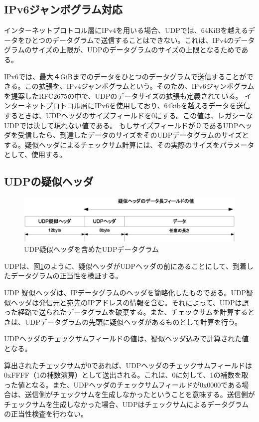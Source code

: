 \subsection{IPv6ジャンボグラム対応}
インターネットプロトコル層にIPv4を用いる場合、UDPでは、64KiBを越えるデータをひとつのデータグラムで送信することはできない。これは、IPv4のデータグラムのサイズの上限が、UDPのデータグラムのサイズの上限となるためである。

IPv6では、最大４GiBまでのデータをひとつのデータグラムで送信することができる。この拡張を、IPv4ジャンボグラムという。そのため、IPv6ジャンボグラムを提案したRFC2675の中で、UDPのデータサイズの拡張も定義されている。
インターネットプロトコル層にIPv6を使用しており、64kibを越えるデータを送信するときは、UDPヘッダのサイズフィールドを0にする。この値は、レガシーなUDPでは決して現れない値である。
もしサイズフィールドが０であるUDPヘッダを受信したら、到達したデータのサイズをそのUDPデータグラムのサイズとする。疑似ヘッダによるチェックサム計算には、その実際のサイズをパラメータとして、使用する。




\subsection{UDPの疑似ヘッダ}

\begin{figure}[htbp]
	\includegraphics[width=12cm,clip]{draw/udppseudoheader.eps}
	\caption{UDP疑似ヘッダを含めたUDPデータグラム}
	\label{fig:udppseudoheader}
\end{figure}


UDPは、図\ref{fig:udppseudoheader}のように、疑似ヘッダがUDPヘッダの前にあることにして、到着したデータグラムの正当性を検証する。

UDP 疑似ヘッダは、IPデータグラムのヘッダを簡略化したものである。UDP疑似ヘッダは発信元と宛先のIPアドレスの情報を含む。それによって、UDPは誤った経路で送られたデータグラムを破棄する。また、チェックサムを計算するときは、UDPデータグラムの先頭に疑似ヘッダがあるものとして計算を行う。

UDPヘッダのチェックサムフィールドの値は、疑似ヘッダ込みで計算された値となる。


算出されたチェックサムが0であれば、UDPヘッダのチェックサムフィールドは0xFFFF（1の補数演算）として送出される。これは、0に対して、1の補数を取った値となる。また、UDPヘッダのチェックサムフィールドが0x0000である場合は、送信側がチェックサムを生成しなかったということを意味する。送信側がチェックサムを生成しなかった場合、UDPはチェックサムによるデータグラムの正当性検査を行わない。

